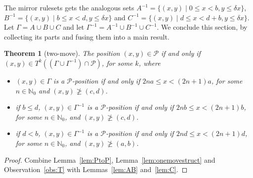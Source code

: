\documentclass{amsart}
\theoremstyle{plain}
\newtheorem{thm}{Theorem}%
\theoremstyle{definition}
\renewcommand{\P}{\ensuremath{\mathcal P}}
\newcommand{\nz}{\mathbb N_0}
\renewcommand{\ge}{\geqslant}
\renewcommand{\le}{\leqslant}
\begin{document}
The mirror rulesets gets the analogous sets $A^{-1}=\{(x,y)\mid 0\le x<b, y\le \delta x\}$, $B^{-1}=\{(x,y)\mid b\le x<d, y\le \delta x\}$ and $C^{-1}=\{(x,y)\mid d\le x<d+b, y\le \delta x\}$. 
 Let $\Gamma = A\cup B\cup C$ and let $\Gamma^{-1}=A^{-1}\cup B^{-1}\cup C^{-1}$. 
We conclude this section, by collecting its parts and fusing them into a main result. 
\begin{thm}[{\sc two-move}]\label{thm:2m2dim}
The position $(x,y)\in \P$ if and only if  $(x,y)\in T^k((\Gamma\cup \Gamma^{-1})\cap \P)$, for some $k$, %
where 
\begin{itemize}
\item $(x,y)\in \Gamma $ is a \P-position if and only if $2na\le x< (2n+1)a$, for some $n\in \nz$ and  $(x,y)\not\ge (c,d)$. 
\item if $b\le d$,  $(x,y)\in  \Gamma^{-1}$ is a \P-position if and only if $2nb\le x< (2n+1)b$, for some $n\in \nz$, and $(x,y)\not\ge (c,d)$. 
\item if $d<b$, $(x,y)\in  \Gamma^{-1}$ is a \P-position if and only if $2nd\le x< (2n+1)d$, for some $n\in \nz$, and $(x,y)\not\ge (a,b)$. 

\end{itemize}
\end{thm}
 \begin{proof}
 Combine Lemma~\ref{lem:PtoP}, Lemma~\ref{lem:onemovestruct} and Observation~\ref{obs:T} with Lemmas~\ref{lem:AB} and~\ref{lem:C}.  
 \end{proof}
\end{document}
